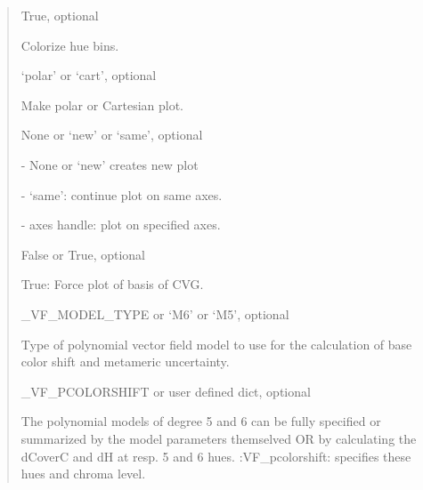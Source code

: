 \documentclass[letterpaper,10pt,english]{sphinxmanual}
\begin{document}
\begin{fulllineitems}
\begin{description}
\begin{quote}
\begin{description}
\item[{plot\_bin\_colors}] \leavevmode
\begin{DUlineblock}{0em}
\item[] True, optional
\item[] Colorize hue bins.
\end{DUlineblock}

\item[{axtype}] \leavevmode
\begin{DUlineblock}{0em}
\item[] ‘polar’ or ‘cart’, optional
\item[] Make polar or Cartesian plot.
\end{DUlineblock}

\item[{ax}] \leavevmode
\begin{DUlineblock}{0em}
\item[] None or ‘new’ or ‘same’, optional
\item[]
\begin{DUlineblock}{\DUlineblockindent}
\item[] - None or ‘new’ creates new plot
\item[] - ‘same’: continue plot on same axes.
\item[] - axes handle: plot on specified axes.
\end{DUlineblock}
\end{DUlineblock}

\item[{force\_CVG\_layout}] \leavevmode
\begin{DUlineblock}{0em}
\item[] False or True, optional
\item[] True: Force plot of basis of CVG.
\end{DUlineblock}

\item[{vf\_model\_type}] \leavevmode
\begin{DUlineblock}{0em}
\item[] \_VF\_MODEL\_TYPE or ‘M6’ or ‘M5’, optional
\item[] Type of polynomial vector field model to use for the calculation of
base color shift and metameric uncertainty.
\end{DUlineblock}

\item[{vf\_pcolorshift}] \leavevmode
\begin{DUlineblock}{0em}
\item[] \_VF\_PCOLORSHIFT or user defined dict, optional
\item[] The polynomial models of degree 5 and 6 can be fully specified or 
summarized by the model parameters themselved OR by calculating the
dCoverC and dH at resp. 5 and 6 hues. :VF\_pcolorshift: specifies 
these hues and chroma level.
\end{DUlineblock}


\end{description}
\end{quote}
\end{description}
\end{fulllineitems}
\end{document}

